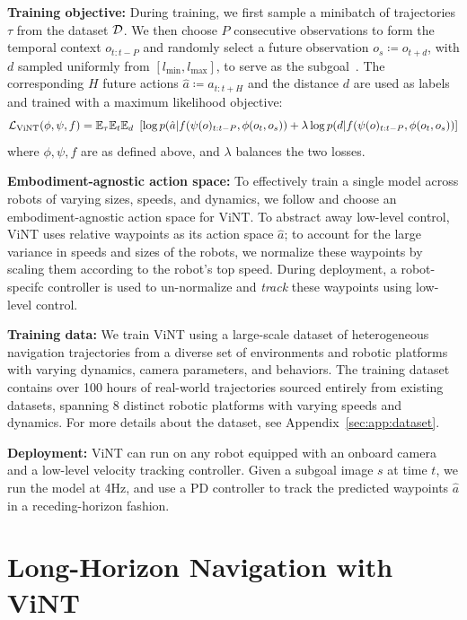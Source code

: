 \documentclass{article}
\newcommand{\ModelName}{ViNT\xspace}
\newcommand{\MyPara}[1]{\noindent\textbf{#1}}
\begin{document}
\MyPara{Training objective:}
During training, we first sample a minibatch of trajectories $\tau$ from the dataset ${\mathcal{D}}$. We then choose $P$ consecutive observations to form the temporal context $o_{t:t-P}$ and randomly select a future observation $o_s \coloneqq o_{t+d}$, with $d$ sampled uniformly from $[l_\text{min}, l_\text{max}]$, to serve as the subgoal~\cite{hartikainen2020}. The corresponding $H$ future actions $\hat{a}\coloneqq a_{t:t+H}$ and the distance $d$ are used as labels and trained with a maximum likelihood objective:
\begin{equation}
    \gL_\text{\ModelName}(\phi, \psi, f) = \mathbb{E}_{\tau} {\mathbb{E}}_t {\mathbb{E}}_d \,\, \left[\log p(\hat{a} | f(\psi(o)_{t:t-P}, \phi(o_t,o_s)) + \lambda \log p(d | f(\psi(o)_{t:t-P}, \phi(o_t,o_s))\right]
    \label{eq:training_objective}
\end{equation}
where $\phi,\psi,f$ are as defined above, and $\lambda$ balances the two losses.

\MyPara{Embodiment-agnostic action space:} To effectively train a single model across robots of varying sizes, speeds, and dynamics, we follow \citet{shah2022gnm} and choose an embodiment-agnostic action space for \ModelName. To abstract away low-level control, \ModelName uses relative waypoints as its action space $\hat{a}$; to account for the large variance in speeds and sizes of the robots, we normalize these waypoints by scaling them according to the robot's top speed. During deployment, a robot-specifc controller is used to un-normalize and \emph{track} these waypoints using low-level control.

\MyPara{Training data:} We train \ModelName using a large-scale dataset of heterogeneous navigation trajectories from a diverse set of environments and robotic platforms with varying dynamics, camera parameters, and behaviors. The training dataset contains over 100 hours of real-world trajectories sourced entirely from existing datasets, spanning 8 distinct robotic platforms with varying speeds and dynamics. For more details about the dataset, see Appendix~\ref{sec:app:dataset}.

\MyPara{Deployment:} \ModelName can run on any robot equipped with an onboard camera and a low-level velocity tracking controller.
Given a subgoal image $s$ at time $t$, we run the model at 4Hz, and use a PD controller to track the predicted waypoints $\hat{a}$ in a receding-horizon fashion.


\section{Long-Horizon Navigation with \ModelName}
\label{sec:method_viking}
\end{document}

